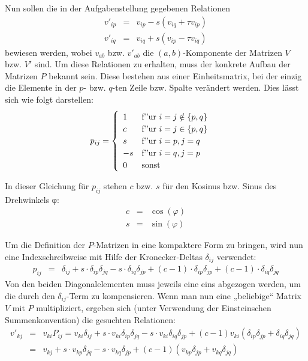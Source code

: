 Nun sollen die in der Aufgabenstellung gegebenen Relationen
\begin{eqnarray}
v'_{ip} &=& v_{ip} - s(v_{iq} + τv_{ip})\\
v'_{iq} &=& v_{iq} + s(v_{ip} - τv_{iq})
\end{eqnarray}
bewiesen werden, wobei $v_{ab}$ bzw. $v'_{ab}$ die $(a,b)$-Komponente der
Matrizen $V$ bzw. $V'$ sind. Um diese Relationen zu erhalten, muss der
konkrete Aufbau der Matrizen $P$ bekannt sein. Diese bestehen aus einer
Einheitsmatrix, bei der einzig die Elemente in der $p$- bzw. $q$-ten Zeile bzw.
Spalte verändert werden. Dies lässt sich wie folgt darstellen:
\begin{equation}
p_{ij} = \begin{cases}\begin{array}[h]{ll}
1 & \mathrm{f"ur~} i=j \notin \{p,q\} \\c & \mathrm{f"ur~} i=j \in \{p,q\}\\s &
\mathrm{f"ur~} i=p, j=q\\-s & \mathrm{f"ur~} i=q, j=p\\0 & \mathrm{sonst}
\end{array}\end{cases}
\end{equation}

In dieser Gleichung für $p_{ij}$ stehen $c$ bzw. $s$ für den Kosinus bzw. Sinus
des Drehwinkels φ:
\begin{eqnarray}
c &=& \cos(φ)\\
s &=& \sin(φ)
\end{eqnarray}

Um die Definition der $P$-Matrizen in eine kompaktere Form zu bringen, wird nun
eine Indexschreibweise mit Hilfe der Kronecker-Deltas $δ_{ij}$ verwendet:
\begin{eqnarray}
p_{ij} &=& δ_{ij} + s\cdot δ_{ip}δ_{jq} - s\cdot δ_{iq}δ_{jp} + (c-1)\cdot
δ_{ip}δ_{jp} + (c-1)\cdot δ_{iq}δ_{jq}
\end{eqnarray}
Von den beiden Diagonalelementen muss jeweils eine eins abgezogen werden, um
die durch den $δ_{ij}$-Term zu kompensieren. Wenn man nun eine „beliebige“
Matrix $V$ mit $P$ multipliziert, ergeben sich (unter Verwendung der
Einsteinschen Summenkonvention) die gesuchten Relationen:
\begin{eqnarray}
v'_{kj} &=& v_{ki} P_{ij} = v_{ki}δ_{ij} + s\cdot v_{ki}δ_{ip}δ_{jq} - s\cdot
v_{ki}δ_{iq}δ_{jp} + (c-1)v_{ki}(δ_{ip}δ_{jp} + δ_{iq}δ_{jq})\\
&=& v_{kj} + s\cdot v_{kp}δ_{jq} - s\cdot v_{kq}δ_{jp} + (c-1)(v_{kp}δ_{jp} +
v_{kq}δ_{jq})
\end{eqnarray}

